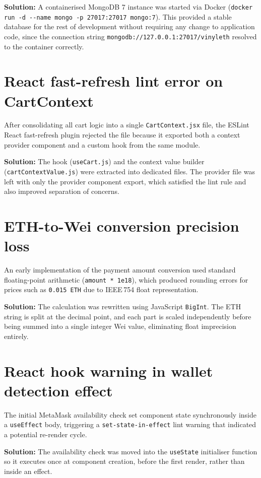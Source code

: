 \documentclass[11pt, a4paper]{report}
\begin{document}
\textbf{Solution:} A containerised MongoDB 7 instance was started via Docker (\texttt{docker run -d -{}-name mongo -p 27017:27017 mongo:7}). This provided a stable database for the rest of development without requiring any change to application code, since the connection string \texttt{mongodb://127.0.0.1:27017/vinyleth} resolved to the container correctly.

\section{React fast-refresh lint error on CartContext}

After consolidating all cart logic into a single \texttt{CartContext.jsx} file, the ESLint React fast-refresh plugin rejected the file because it exported both a context provider component and a custom hook from the same module.

\textbf{Solution:} The hook (\texttt{useCart.js}) and the context value builder (\texttt{cartContextValue.js}) were extracted into dedicated files. The provider file was left with only the provider component export, which satisfied the lint rule and also improved separation of concerns.

\section{ETH-to-Wei conversion precision loss}

An early implementation of the payment amount conversion used standard floating-point arithmetic (\texttt{amount * 1e18}), which produced rounding errors for prices such as \texttt{0.015 ETH} due to IEEE\,754 float representation.

\textbf{Solution:} The calculation was rewritten using JavaScript \texttt{BigInt}. The ETH string is split at the decimal point, and each part is scaled independently before being summed into a single integer Wei value, eliminating float imprecision entirely.

\section{React hook warning in wallet detection effect}

The initial MetaMask availability check set component state synchronously inside a \texttt{useEffect} body, triggering a \texttt{set-state-in-effect} lint warning that indicated a potential re-render cycle.

\textbf{Solution:} The availability check was moved into the \texttt{useState} initialiser function so it executes once at component creation, before the first render, rather than inside an effect.
\end{document}
